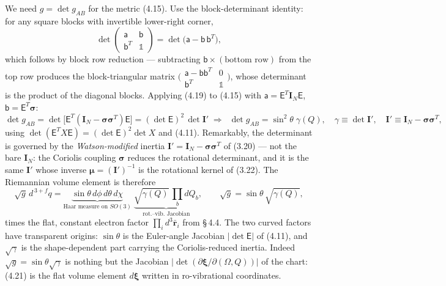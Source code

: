 We need $g=\det g_{AB}$ for the metric (4.15). Use the block-determinant identity: for any square blocks with invertible lower-right corner,
\begin{equation}
\det\!\begin{pmatrix}\mathsf a&\mathsf b\\ \mathsf b^{T}&\mathbb 1\end{pmatrix}
=\det\!\bigl(\mathsf a-\mathsf b\,\mathsf b^{T}\bigr), \tag{4.19}
\end{equation}
which follows by block row reduction --- subtracting $\mathsf b\times(\text{bottom row})$ from the top row produces the block-triangular matrix $\bigl(\begin{smallmatrix}\mathsf a-\mathsf b\mathsf b^{T}&0\\ \mathsf b^{T}&\mathbb 1\end{smallmatrix}\bigr)$, whose determinant is the product of the diagonal blocks. Applying (4.19) to (4.15) with $\mathsf a=\mathsf E^{T}\mathbf I_N\mathsf E$, $\mathsf b=\mathsf E^{T}\boldsymbol\sigma$:
\begin{equation}
\det g_{AB}
=\det\!\bigl[\mathsf E^{T}(\mathbf I_N-\boldsymbol\sigma\boldsymbol\sigma^{T})\mathsf E\bigr]
=(\det\mathsf E)^2\,\det\mathbf I'
\;\Longrightarrow\;
\boxed{\;\det g_{AB}=\sin^2\!\theta\;\gamma(Q),\quad
\gamma\equiv\det\mathbf I',\quad
\mathbf I'\equiv\mathbf I_N-\boldsymbol\sigma\boldsymbol\sigma^{T},\;}\tag{4.20}
\end{equation}
using $\det(\mathsf E^{T}X\mathsf E)=(\det\mathsf E)^2\det X$ and (4.11). Remarkably, the determinant is governed by the \emph{Watson-modified} inertia $\mathbf I'=\mathbf I_N-\boldsymbol\sigma\boldsymbol\sigma^{T}$ of (3.20) --- not the bare $\mathbf I_N$: the Coriolis coupling $\boldsymbol\sigma$ reduces the rotational determinant, and it is the same $\mathbf I'$ whose inverse $\boldsymbol\mu=(\mathbf I')^{-1}$ is the rotational kernel of (3.22). The Riemannian volume element is therefore
\begin{equation}
\boxed{\;
\sqrt{g}\,d^{\,3+f}q=\underbrace{\sin\theta\,d\phi\,d\theta\,d\chi}_{\text{Haar measure on }SO(3)}\;\underbrace{\sqrt{\gamma(Q)}\,\textstyle\prod_b dQ_b}_{\text{rot.--vib.\ Jacobian}},\qquad \sqrt{g}=\sin\theta\,\sqrt{\gamma(Q)},\;}\tag{4.21}
\end{equation}
times the flat, constant electron factor $\prod_id^3\bar{\mathbf r}_i$ from \S\,4.4. The two curved factors have transparent origins: $\sin\theta$ is the Euler-angle Jacobian $|\det\mathsf E|$ of (4.11), and $\sqrt\gamma$ is the shape-dependent part carrying the Coriolis-reduced inertia. Indeed $\sqrt g=\sin\theta\sqrt\gamma$ is nothing but the Jacobian $|\det(\partial\boldsymbol\xi/\partial(\Omega,Q))|$ of the chart: (4.21) is the flat volume element $d\boldsymbol\xi$ written in ro-vibrational coordinates.

